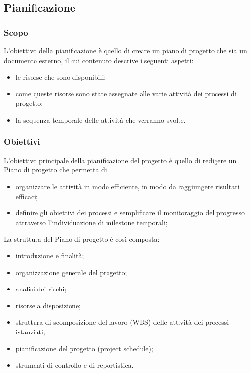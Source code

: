 \subsection{Pianificazione}

\subsubsection{Scopo}
L'obiettivo della pianificazione è quello di creare un piano di progetto che sia un documento esterno, il cui contenuto descrive i seguenti aspetti:
\begin{itemize}
    \item le risorse che sono disponibili;
    \item come queste risorse sono state assegnate alle varie attività dei processi di progetto;
    \item la sequenza temporale delle attività che verranno svolte.
\end{itemize}

\subsubsection{Obiettivi}
L'obiettivo principale della pianificazione del progetto è quello di redigere un Piano di progetto che permetta di:
\begin{itemize}
    \item organizzare le attività in modo efficiente, in modo da raggiungere risultati efficaci;
    \item definire gli obiettivi dei processi e semplificare il monitoraggio del progresso attraverso l'individuazione di milestone temporali;
\end{itemize}
La struttura del Piano di progetto è così composta:
\begin{itemize}
    \item introduzione e finalità;
    \item organizzazione generale del progetto;
    \item analisi dei rischi;
    \item risorse a disposizione;
    \item struttura di scomposizione del lavoro (WBS) delle attività dei processi istanziati;
    \item pianificazione del progetto (project schedule);
    \item strumenti di controllo e di reportistica.
\end{itemize}


